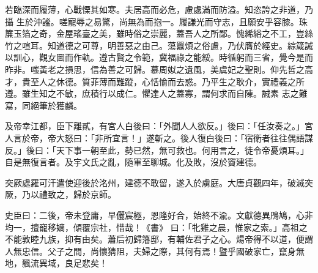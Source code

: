 \begin{pinyinscope}
 若臨深而履薄，心戰慄其如寒。夫居高而必危，慮處滿而防溢。知恣誇之非道，乃攝
 生於沖謐。嗟寵辱之易驚，尚無為而抱一。履謙光而守志，且願安乎容膝。珠簾玉箔之奇，金屋瑤臺之美，雖時俗之崇麗，蓋吾人之所鄙。愧絺綌之不工，豈絲竹之喧耳。知道德之可尊，明善惡之由己。蕩囂煩之俗慮，乃伏膺於經史。綜箴誡以訓心，觀女圖而作軌。遵古賢之令範，冀福祿之能綏。時循躬而三省，覺今是而昨非。嗤黃老之損思，信為善之可歸。慕周姒之遺風，美虞妃之聖則。仰先哲之高才，貴至人之休德。質菲薄而難蹤，心恬愉而去惑。乃平生之耿介，實禮義之所遵。雖生知之不敏，庶積行以成仁。懼達人之蓋寡，謂何求而自陳。誠素
 志之難寫，同絕筆於獲麟。



 及帝幸江都，臣下離貳，有宮人白後曰：「外聞人人欲反。」後曰：「任汝奏之。」宮人言於帝，帝大怒曰：「非所宜言！」遂斬之。後人復白後曰：「宿衛者往往偶語謀反。」後曰：「天下事一朝至此，勢已然，無可救也。何用言之，徒令帝憂煩耳。」自是無復言者。及宇文氏之亂，隨軍至聊城。化及敗，沒於竇建德。



 突厥處羅可汗遣使迎後於洺州，建德不敢留，遂入於虜庭。大唐貞觀四年，破滅突厥，乃以禮致之，歸於京師。



 史臣曰：二後，帝未登庸，早儷宸極，恩隆好合，始終不渝。文獻德異鳲鳩，心非均一，擅寵移嫡，傾覆宗社，惜哉！《書》
 曰：「牝雞之晨，惟家之索。」高祖之不能敦睦九族，抑有由矣。蕭后初歸籓邸，有輔佐君子之心。煬帝得不以道，便謂人無忠信。父子之間，尚懷猜阻，夫婦之際，其何有焉！暨乎國破家亡，竄身無地，飄流異域，良足悲矣！



\end{pinyinscope}
